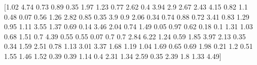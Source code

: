 \documentclass[preview]{standalone}
\begin{document}
\begin{center}
[1.02 4.74 0.73 0.89 0.35 1.97 1.23 0.77 2.62 0.4  3.94 2.9  2.67 2.43
 4.15 0.82 1.1  0.48 0.07 0.56 1.26 2.82 0.85 0.35 3.9  0.9  2.06 0.34
 0.74 0.88 0.72 3.41 0.83 1.29 0.95 1.11 3.55 1.37 0.69 0.14 3.46 2.04
 0.74 1.49 0.05 0.97 0.62 0.18 0.1  1.31 1.03 0.68 1.51 0.7  4.39 0.55
 0.55 0.07 0.7  0.7  2.84 6.22 1.24 0.59 1.85 3.97 2.13 0.35 0.34 1.59
 2.51 0.78 1.13 3.01 3.37 1.68 1.19 1.04 1.69 0.65 0.69 1.98 0.21 1.2
 0.51 1.55 1.46 1.52 0.39 0.39 1.14 0.4  2.31 1.34 2.59 0.35 2.39 1.8
 1.33 4.49]
\end{center}
\end{document}
